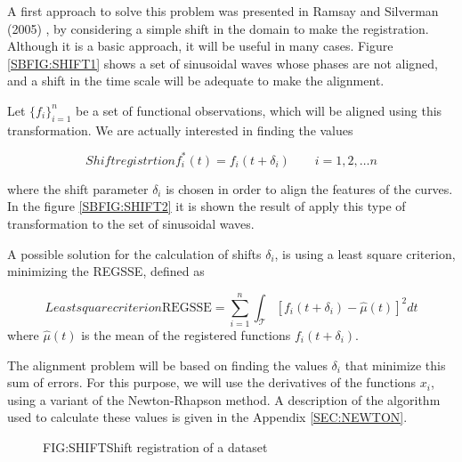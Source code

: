 
A first approach to solve this problem was presented in Ramsay and Silverman
(2005) \cite{Ramsay2005}, by considering a simple shift in the domain to make the
registration. Although it is a basic approach, it will be useful in many cases.
Figure \ref{SBFIG:SHIFT1} shows a set of sinusoidal waves whose phases are not
aligned, and a shift in the time scale will be adequate to make the alignment.

Let $\{f_i\}_{i=1}^n$ be a set of functional observations, which will be aligned
using this transformation. We are actually interested in finding the values

\begin{equation}[EQN:SHIFTS]{Shift registrtion}
f_i^*(t)=f_i(t+ \delta_i) \qquad i=1,2, \dots n
\end{equation}

where the shift parameter $\delta_i$ is chosen in order to align the features of
the curves. In the figure \ref{SBFIG:SHIFT2} it is shown the result of apply
this type of transformation to the set of sinusoidal waves.


A possible solution for the calculation of shifts $\delta_i$, is using a least
square criterion, minimizing the  \ac{REGSSE}, defined as

\begin{equation}[EQ:REGSSE]{Least square criterion}
\text{REGSSE} = \sum_{i=1}^{n}\int_{\mathcal{T}}\left [f_i(t+\delta_i) - \hat \mu(t) \right ]^2 dt
\end{equation}
where $\hat \mu(t)$ is the mean of the registered functions $f_i(t+\delta_i)$.

The alignment problem will be based on finding the values $\delta_i$ that
minimize this sum of errors. For this purpose,
we will use the derivatives of the functions $x_i$, using a variant of the
Newton-Rhapson method. A description of the algorithm used to calculate these
values is given in the Appendix \ref{SEC:NEWTON}.

\begin{figure}[Shift registration of a dataset]{FIG:SHIFT}{Shift registration of a dataset}
	 \quad
\end{figure}
